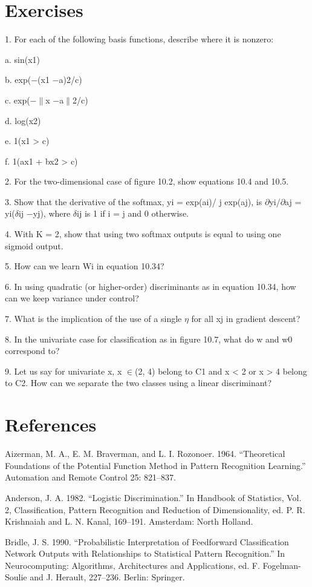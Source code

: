 \section{Exercises}

1. For each of the following basis functions, describe where it is nonzero:

a. sin(x1)

b. exp($-$(x1 $-$a)2/c)

c. exp($-$$\parallel$x $-$a$\parallel$2/c)

d. log(x2)

e. 1(x1 > c)

f. 1(ax1 + bx2 > c)

2. For the two-dimensional case of figure 10.2, show equations 10.4 and 10.5.

3. Show that the derivative of the softmax, yi = exp(ai)/ j exp(aj), is $\partial$yi/$\partial$aj = yi($\delta$ij $-$yj), where $\delta$ij is 1 if i = j and 0 otherwise.

4. With K = 2, show that using two softmax outputs is equal to using one sigmoid output.

5. How can we learn Wi in equation 10.34?

6. In using quadratic (or higher-order) discriminants as in equation 10.34, how can we keep variance under control?

7. What is the implication of the use of a single $\eta$ for all xj in gradient descent?

8. In the univariate case for classification as in figure 10.7, what do w and w0 correspond to?

9. Let us say for univariate x, x $\in$(2, 4) belong to C1 and x < 2 or x > 4 belong to C2. How can we separate the two classes using a linear discriminant?

\section{References}

Aizerman, M. A., E. M. Braverman, and L. I. Rozonoer. 1964. “Theoretical Foundations of the Potential Function Method in Pattern Recognition Learning.” Automation and Remote Control 25: 821--837.

Anderson, J. A. 1982. “Logistic Discrimination.” In Handbook of Statistics, Vol. 2, Classification, Pattern Recognition and Reduction of Dimensionality, ed. P. R. Krishnaiah and L. N. Kanal, 169--191. Amsterdam: North Holland.

Bridle, J. S. 1990. “Probabilistic Interpretation of Feedforward Classification Network Outputs with Relationships to Statistical Pattern Recognition.” In Neurocomputing: Algorithms, Architectures and Applications, ed. F. Fogelman- Soulie and J. Herault, 227--236. Berlin: Springer.

